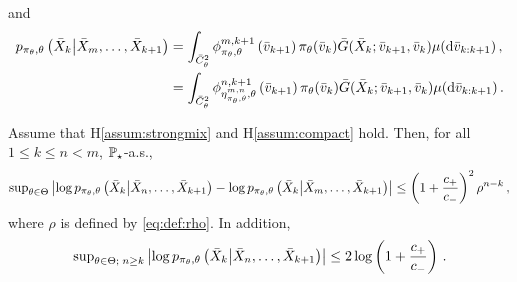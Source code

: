 and 
\begin{align*}
p_{\pi_{\theta},\theta}\left(\bar X_{k}\middle| \bar X_{m},\ldots,\bar X_{k+1}\right) &= \int_{\bar C_{\theta}^2}\phi^{m,k+1}_{\pi_{\theta},\theta}\left(\bar v_{k+1}\right)\pi_{\theta}(\bar v_{k})\bar G(\bar X_{k};\bar v_{k+1},\bar v_{k})\mu(\mathrm{d} \bar v_{k:k+1})\,,\\
&=\int_{\bar C_{\theta}^2}\phi^{n,k+1}_{\eta^{m,n}_{\pi_{\theta},\theta},\theta}\left(\bar v_{k+1}\right)\pi_{\theta}(\bar v_{k})\bar G(\bar X_{k};\bar v_{k+1},\bar v_{k})\mu(\mathrm{d} \bar v_{k:k+1})\,.
\end{align*}
\begin{lemma}
\label{lem:uniformforgetting}
Assume that H\ref{assum:strongmix} and H\ref{assum:compact} hold. Then, for all $1\le k \le n < m$, $\mathbb{P}_{\star}$-a.s.,
\[
\mathrm{sup}_{\theta\in\Theta}\left|\log p_{\pi_{\theta},\theta}\left(\bar X_{k}\middle| \bar X_{n},\ldots,\bar X_{k+1}\right) - \log p_{\pi_{\theta},\theta}\left(\bar X_{k}\middle| \bar X_{m},\ldots,\bar X_{k+1}\right)\right| \le \left(1+\frac{c_+}{c_-}\right)^2\rho^{n-k}\,,
\]
where $\rho$ is defined by \eqref{eq:def:rho}.
In addition,
\[
\mathrm{sup}_{\theta\in\Theta;\;n\ge k}\left|\log p_{\pi_{\theta},\theta}\left(\bar X_{k}\middle| \bar X_{n},\ldots,\bar X_{k+1}\right)\right|\le 2\log\left(1+\frac{c_+}{c_-}\right)\,. 
\]
\end{lemma}
